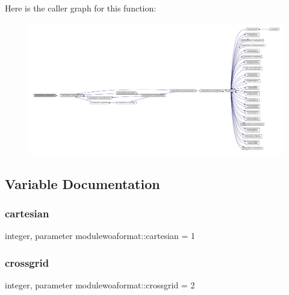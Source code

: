 Here is the caller graph for this function\+:\nopagebreak
\begin{figure}[H]
\begin{center}
\leavevmode
\includegraphics[width=350pt]{namespacemodulewoaformat_a2416c77f949cd03e164c70c78493ad37_icgraph}
\end{center}
\end{figure}


\subsection{Variable Documentation}
\mbox{\label{namespacemodulewoaformat_af19bc667cadaffe97caf9561001439d5}} 
\subsubsection{\texorpdfstring{cartesian}{cartesian}}
{\footnotesize\ttfamily integer, parameter modulewoaformat\+::cartesian = 1\hspace{0.3cm}{\ttfamily [private]}}

\mbox{\label{namespacemodulewoaformat_a52d7e1d75349b1ff55f1e87ceeb9448d}} 
\subsubsection{\texorpdfstring{crossgrid}{crossgrid}}
{\footnotesize\ttfamily integer, parameter modulewoaformat\+::crossgrid = 2\hspace{0.3cm}{\ttfamily [private]}}

